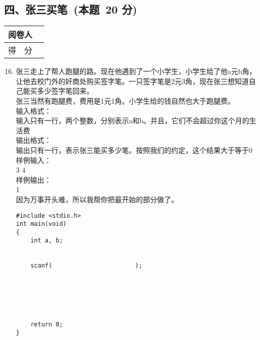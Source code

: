 \documentclass[twocolumn,landscape,UTF8]{ctexart}
\begin{document}
\begin{spacing}{1.3}
\section*{\hspace{4.5cm} 四、张三买笔~(本题~20 分)}
\vspace{-1.5cm}
\begin{tabular}{|p{}|p{}|}
  \hline
    \centering 阅卷人 &         \\
  \hline
    \centering 得~~分 &         \\
  \hline
\end{tabular}
\begin{enumerate}\setcounter{enumi}{15}
    \item 张三走上了帮人跑腿的路。现在他遇到了一个小学生，小学生给了他a元b角，让他去校门外的奸商处购买签字笔。一只签字笔是2元3角，现在张三想知道自己能买多少签字笔回来。                                            \\
    张三当然有跑腿费，费用是1元1角。小学生给的钱自然也大于跑腿费。           \\
    输入格式：                                                        \\
    输入只有一行，两个整数，分别表示a和b。并且，它们不会超过你这个月的生活费  \\
    输出格式：                                                        \\
    输出只有一行，表示张三能买多少笔。按照我们的约定，这个结果大于等于0       \\
    样例输入：                                                        \\
    3 4                                                              \\
    样例输出：                                                        \\
    1                                                                \\
    因为万事开头难，所以我帮你把最开始的部分做了。
\begin{lstlisting}
#include <stdio.h>
int main(void)
{
    int a, b;


    scanf(                       );






    return 0;
}
\end{lstlisting}
\end{enumerate}

\end{spacing}
\end{document}
